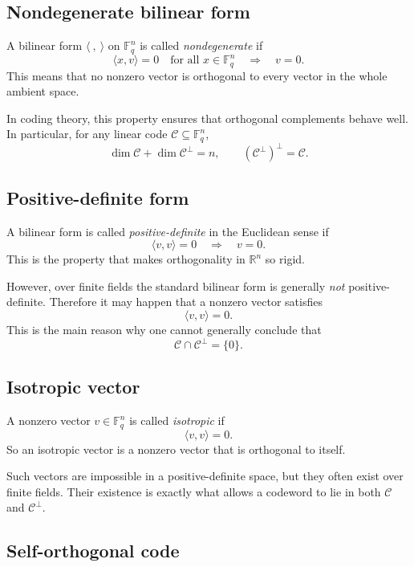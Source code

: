 \documentclass[11pt]{article}
\theoremstyle{remark}
\newcommand{\F}{\mathbb{F}}
\begin{document}
	\subsection*{Nondegenerate bilinear form}
	
	A bilinear form \(\langle\ ,\ \rangle\) on \(\F_q^n\) is called \emph{nondegenerate} if
	\[
	\langle x,v\rangle=0 \quad \text{for all } x\in \F_q^n
	\quad \Longrightarrow \quad
	v=0.
	\]
	This means that no nonzero vector is orthogonal to every vector in the whole ambient space.
	
	In coding theory, this property ensures that orthogonal complements behave well. In particular, for any linear code \(\mathcal C\subseteq \F_q^n\),
	\[
	\dim \mathcal C+\dim \mathcal C^\perp=n,
	\qquad
	(\mathcal C^\perp)^\perp=\mathcal C.
	\]
	
	\subsection*{Positive-definite form}
	
	A bilinear form is called \emph{positive-definite} in the Euclidean sense if
	\[
	\langle v,v\rangle=0 \quad \Longrightarrow \quad v=0.
	\]
	This is the property that makes orthogonality in \(\mathbb R^n\) so rigid.
	
	However, over finite fields the standard bilinear form is generally \emph{not} positive-definite. Therefore it may happen that a nonzero vector satisfies
	\[
	\langle v,v\rangle=0.
	\]
	This is the main reason why one cannot generally conclude that
	\[
	\mathcal C\cap \mathcal C^\perp=\{0\}.
	\]
	
	\subsection*{Isotropic vector}
	
	A nonzero vector \(v\in \F_q^n\) is called \emph{isotropic} if
	\[
	\langle v,v\rangle=0.
	\]
	So an isotropic vector is a nonzero vector that is orthogonal to itself.
	
	Such vectors are impossible in a positive-definite space, but they often exist over finite fields. Their existence is exactly what allows a codeword to lie in both \(\mathcal C\) and \(\mathcal C^\perp\).
	
	\subsection*{Self-orthogonal code}
	
\end{document}
